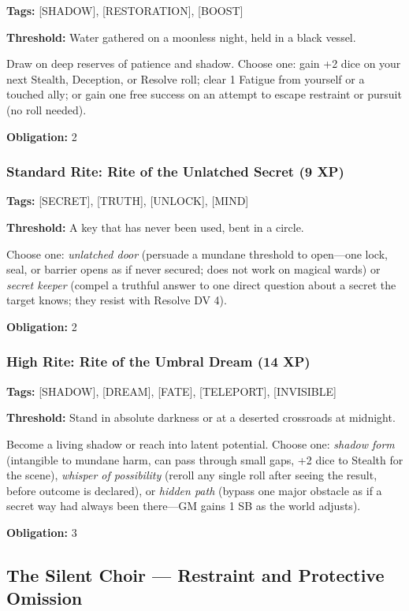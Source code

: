 \textbf{Tags:} [SHADOW], [RESTORATION], [BOOST]

\textbf{Threshold:} Water gathered on a moonless night, held in a black vessel.

Draw on deep reserves of patience and shadow. Choose one: gain +2 dice on your next Stealth, Deception, or Resolve roll; clear 1 Fatigue from yourself or a touched ally; or gain one free success on an attempt to escape restraint or pursuit (no roll needed).

\textbf{Obligation:} 2

\subsubsection{Standard Rite: Rite of the Unlatched Secret (9 XP)}

\textbf{Tags:} [SECRET], [TRUTH], [UNLOCK], [MIND]

\textbf{Threshold:} A key that has never been used, bent in a circle.

Choose one: \textit{unlatched door} (persuade a mundane threshold to open—one lock, seal, or barrier opens as if never secured; does not work on magical wards) or \textit{secret keeper} (compel a truthful answer to one direct question about a secret the target knows; they resist with Resolve DV 4).

\textbf{Obligation:} 2

\subsubsection{High Rite: Rite of the Umbral Dream (14 XP)}

\textbf{Tags:} [SHADOW], [DREAM], [FATE], [TELEPORT], [INVISIBLE]

\textbf{Threshold:} Stand in absolute darkness or at a deserted crossroads at midnight.

Become a living shadow or reach into latent potential. Choose one: \textit{shadow form} (intangible to mundane harm, can pass through small gaps, +2 dice to Stealth for the scene), \textit{whisper of possibility} (reroll any single roll after seeing the result, before outcome is declared), or \textit{hidden path} (bypass one major obstacle as if a secret way had always been there—GM gains 1 SB as the world adjusts).

\textbf{Obligation:} 3

\subsection{The Silent Choir — Restraint and Protective Omission}

